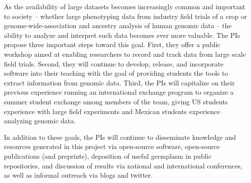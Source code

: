 
As the availability of large datasets becomes increasingly common and important to society -- whether large phenotyping data from industry field trials of a crop or genome-wide-association and ancestry analysis of human genomic data -- the ability to analyze and interpret such data becomes ever more valuable. The PIs propose three important steps toward this goal.  First, they offer a public workshop aimed at enabling researchers to record and track data from large scale field trials.  Second, they will continue to develop, release, and incorporate software into their teaching with the goal of providing students  the tools to extract information from genomic data.  Third, the PIs will capitalize on their previous experience running an international exchange program to organize a summer student exchange among members of the team, giving US students experience with large field experiments and Mexican students experience analyzing genomic data. 

In addition to these goals, the PIs will continue to disseminate knowledge and resources generated in this project via open-source software, open-source publications (and preprints), deposition of useful germplasm in public repositories, and discussion of results via national and international conferences, as well as informal outreach via blogs and twitter.


